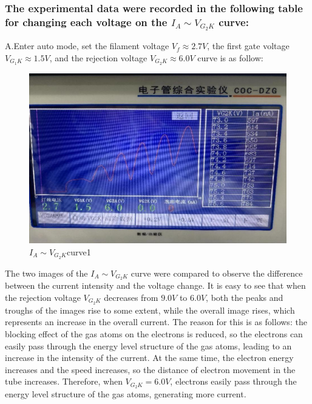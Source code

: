 \documentclass[UTF8]{article}
\begin{document}
\subsubsection{The experimental data were recorded in the following table for changing each voltage on the $I_A\sim V_{G_2K}$ curve:}

A.Enter auto mode, set the filament voltage $V_f\approx 2.7V$, the first gate voltage $V_{G_1K}\approx 1.5V$, and the rejection voltage $V_{G_2K}\approx 6.0V$ curve is as follow:
\begin{figure}[H]
            	\centering
            	\includegraphics[clip,scale=0.8,trim={0 0 0 0}]{fig/fig11.png}
            	\caption{$I_A\sim V_{G_2K}$curve1}
            	\label{figure.11}
\end{figure}
The two images of the $I_A\sim V_{G_2K}$ curve were compared to observe the difference between the current intensity and the voltage change. It is easy to see that when the rejection voltage $V_{G_2K}$ decreases from $9.0V$ to $6.0V$, both the peaks and troughs of the images rise to some extent, while the overall image rises, which represents an increase in the overall current. The reason for this is as follows: the blocking effect of the gas atoms on the electrons is reduced, so the
electrons can easily pass through the energy level structure of the gas atoms, leading to an increase in the intensity of the current. At the same time, the electron energy increases and the speed increases, so the distance of electron movement in the tube increases. Therefore, when $V_{G_2K} =6.0V$, electrons easily pass through the energy level structure of the gas atoms, generating more current.
\end{document}
